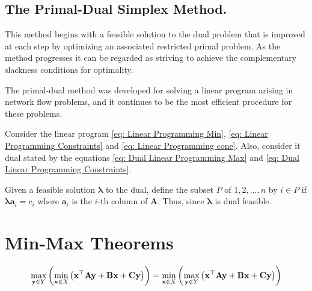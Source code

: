 \subsection{The Primal-Dual Simplex Method.}
This method begins with a feasible solution to the dual problem that is improved at each step by optimizing an associated restricted primal problem. As the method progresses it can be regarded as striving to achieve the complementary slackness conditions for optimality. 

The primal-dual method was developed for solving a linear program arising in network flow problems, and it continues to be the most efficient procedure for these problems.


Consider the linear program \eqref{eq: Linear Programming Min}, \eqref{eq: Linear Programming Constraints} and \eqref{eq: Linear Programming cone}. Also, consider it dual stated by the equations \eqref{eq: Dual Linear Programming Max} and \eqref{eq: Dual Linear Programming Constraints}.  

Given a feasible solution $\pmb{\lambda}$ to the dual, define the subset $P$ of $1,2,\dots, n$ by $i\in P$ if $\pmb{\lambda}\mathbf{a}_i=c_i$ where $\mathbf{a}_i$ is the $i$-th column of $\mathbf{A}$. Thus, since $\pmb{\lambda}$ is dual feasible.

\section{Min-Max Theorems}

\begin{equation}
\max_{\mathbf y\in Y}\left( \min_{\mathbf x \in X}	\left( \mathbf{x}^\top\mathbf{A}\mathbf{y}+\mathbf{B}\mathbf{x} +\mathbf{C}\mathbf{y} \right) \right) =\min_{\mathbf x\in X}\left( \max_{\mathbf y \in Y}	\left( \mathbf{x}^\top\mathbf{A}\mathbf{y}+\mathbf{B}\mathbf{x} +\mathbf{C}\mathbf{y} \right) \right)
\end{equation}

